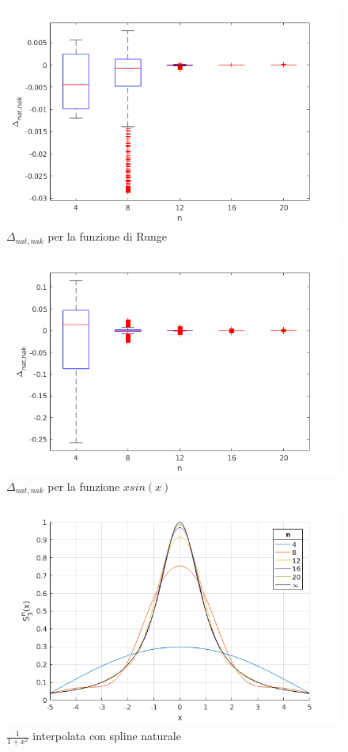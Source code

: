 \begin{figure}
\includegraphics[width=\textwidth]{cap_4/es5/errors}
\caption{$\Delta_{nat, nak}$ per la funzione di Runge}
\label{err_runge}
\end{figure}

\begin{figure}
\includegraphics[width=\textwidth]{cap_4/es5/errors_sin}
\caption{$\Delta_{nat, nak}$ per la funzione $xsin(x)$}
\label{err_sin}
\end{figure}

\begin{figure}
\centering
\includegraphics[width=\textwidth]{cap_4/es5/runge_nat}
\caption{$\frac{1}{1+x^2}$ interpolata con spline naturale}
\label{plot_runge_nat}
\end{figure}

